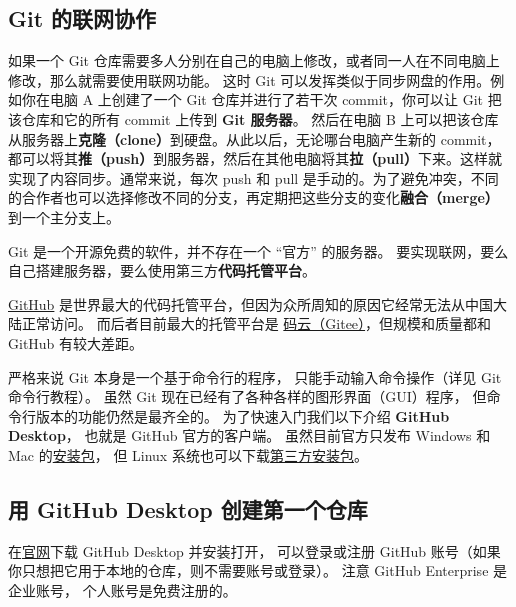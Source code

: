 \subsection{Git 的联网协作}
如果一个 Git 仓库需要多人分别在自己的电脑上修改，或者同一人在不同电脑上修改，那么就需要使用联网功能。 这时 Git 可以发挥类似于同步网盘的作用。例如你在电脑 A 上创建了一个 Git 仓库并进行了若干次 commit，你可以让 Git 把该仓库和它的所有 commit 上传到 \textbf{Git 服务器}。 然后在电脑 B 上可以把该仓库从服务器上\textbf{克隆（clone）}到硬盘。从此以后，无论哪台电脑产生新的 commit，都可以将其\textbf{推（push）}到服务器，然后在其他电脑将其\textbf{拉（pull）}下来。这样就实现了内容同步。通常来说，每次 push 和 pull 是手动的。为了避免冲突，不同的合作者也可以选择修改不同的分支，再定期把这些分支的变化\textbf{融合（merge）}到一个主分支上。

Git 是一个开源免费的软件，并不存在一个 “官方” 的服务器。 要实现联网，要么自己搭建服务器，要么使用第三方\textbf{代码托管平台}。

\href{https://github.com/}{GitHub} 是世界最大的代码托管平台，但因为众所周知的原因它经常无法从中国大陆正常访问。 而后者目前最大的托管平台是 \href{https://gitee.com/}{码云（Gitee）}，但规模和质量都和 GitHub 有较大差距。


严格来说 Git 本身是一个基于命令行的程序， 只能手动输入命令操作（详见 Git 命令行教程）。 虽然 Git 现在已经有了各种各样的图形界面（GUI）程序， 但命令行版本的功能仍然是最齐全的。 为了快速入门我们以下介绍 \textbf{GitHub Desktop}， 也就是 GitHub 官方的客户端。 虽然目前官方只发布 Windows 和 Mac 的\href{https://desktop.github.com/}{安装包}， 但 Linux 系统也可以下载\href{https://github.com/shiftkey/desktop/releases}{第三方安装包}。

\subsection{用 GitHub Desktop 创建第一个仓库}
在\href{https://desktop.github.com/}{官网}下载 GitHub Desktop 并安装打开， 可以登录或注册 GitHub 账号（如果你只想把它用于本地的仓库，则不需要账号或登录）。 注意 GitHub Enterprise 是企业账号， 个人账号是免费注册的。 %


